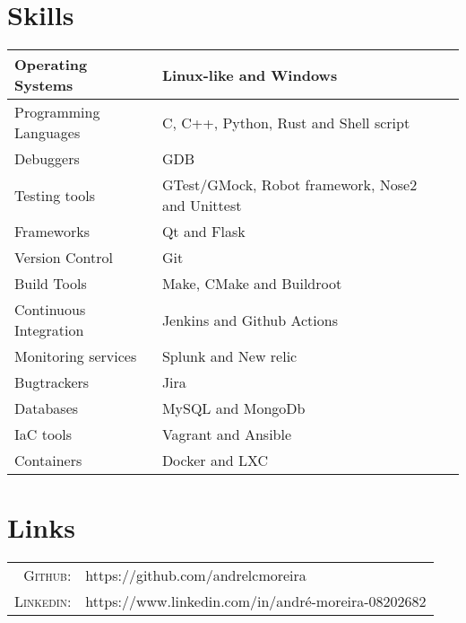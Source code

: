 \documentclass[a4paper,10pt]{article}
\begin{document}
\section{Skills}
\begin{center}
  \begin{tabular}{| l | l | l | l |}
    \hline
    Operating Systems & Linux-like and Windows\\ \hline
    Programming Languages & C, C++, Python, Rust and Shell script\\ \hline
    Debuggers & GDB \\ \hline
    Testing tools & GTest/GMock, Robot framework, Nose2 and Unittest\\ \hline
    Frameworks & Qt and Flask\\ \hline
    Version Control & Git\\ \hline
    Build Tools & Make, CMake and Buildroot\\ \hline
    Continuous Integration & Jenkins and Github Actions\\ \hline
    Monitoring services & Splunk and New relic\\ \hline
    Bugtrackers & Jira\\ \hline
    Databases & MySQL and MongoDb\\ \hline
    IaC tools & Vagrant and Ansible\\ \hline
    Containers & Docker and LXC\\ \hline
  \end{tabular}
\end{center}

\section{Links}
\begin{tabular}{rl}
  \textsc{Github:}& https://github.com/andrelcmoreira\\
  \textsc{Linkedin:}&https://www.linkedin.com/in/andré-moreira-08202682 \\
\end{tabular}
\end{document}
